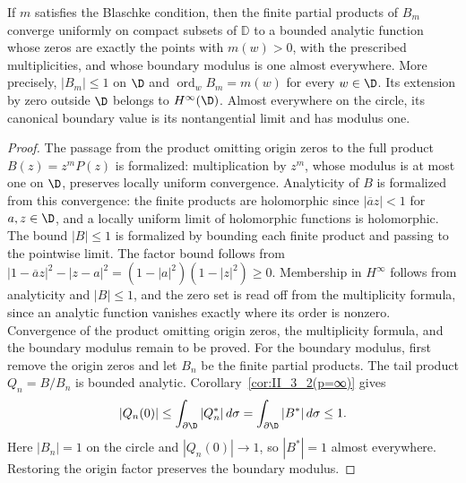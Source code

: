 \begin{theorem}
  \label{thm:II_2_2}
  \leanok
  \mainline
  If $m$ satisfies the Blaschke condition, then the finite partial products
  of $B_m$ converge uniformly on compact subsets of $\mathbb{D}$ to a bounded
  analytic function whose zeros are exactly the points with $m(w)>0$, with
  the prescribed multiplicities, and whose boundary modulus is one almost
  everywhere. More precisely, $|B_m|\le1$ on $\D$ and
  $\operatorname{ord}_w B_m=m(w)$ for every $w\in\D$.
  Its extension by zero outside $\D$ belongs to $H^\infty(\D)$.
  Almost everywhere on the circle, its canonical boundary value is its
  nontangential limit and has modulus one.
  \begin{proof}
    \notready
    The passage from the product omitting origin zeros to the full product
    $B(z)=z^mP(z)$ is formalized: multiplication by $z^m$, whose modulus
    is at most one on $\D$, preserves locally uniform convergence.
    Analyticity of $B$ is formalized from this convergence: the finite
    products are holomorphic since $|\overline{a}z|<1$ for $a,z\in\D$,
    and a locally uniform limit of holomorphic functions is holomorphic.
    The bound $|B|\le1$ is formalized by bounding each finite product
    and passing to the pointwise limit. The factor bound follows from
    $|1-\overline a z|^2-|z-a|^2=(1-|a|^2)(1-|z|^2)\ge0$.
    Membership in $H^\infty$ follows from analyticity and $|B|\le1$, and
    the zero set is read off from the multiplicity formula, since an analytic
    function vanishes exactly where its order is nonzero.
    Convergence of the product omitting origin zeros, the multiplicity
    formula, and the boundary modulus remain to be proved.
    For the boundary modulus, first remove the origin zeros and let $B_n$
    be the finite partial products. The tail product $Q_n=B/B_n$ is bounded
    analytic. Corollary~\ref{cor:II_3_2(p=∞)} gives
    \[
      |Q_n(0)|\le\int_{\partial\D}|Q_n^*|\,d\sigma
      =\int_{\partial\D}|B^*|\,d\sigma\le1.
    \]
    Here $|B_n|=1$ on the circle and $|Q_n(0)|\to1$, so $|B^*|=1$
    almost everywhere. Restoring the origin factor preserves the boundary modulus.
  \end{proof}
\end{theorem}

